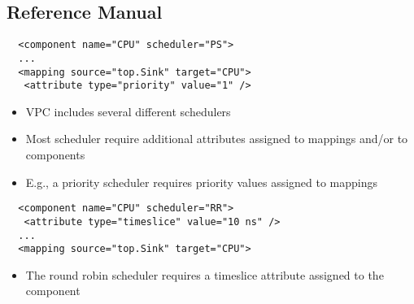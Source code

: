 \subsection{Reference Manual}


\begin{frame}[fragile=singleslide]
\begin{lstlisting}
  <component name="CPU" scheduler="PS">
  ...
  <mapping source="top.Sink" target="CPU">
   <attribute type="priority" value="1" />
\end{lstlisting}
\begin{itemize}
\item VPC includes several different schedulers
\item Most scheduler require additional attributes assigned to mappings and/or to components
\item E.g., a priority scheduler requires priority values assigned to mappings
\end{itemize}
\begin{lstlisting}
  <component name="CPU" scheduler="RR">
   <attribute type="timeslice" value="10 ns" />
  ...
  <mapping source="top.Sink" target="CPU">
\end{lstlisting}
\begin{itemize}
\item The round robin scheduler requires a timeslice attribute assigned to the component
\end{itemize}
\end{frame}


